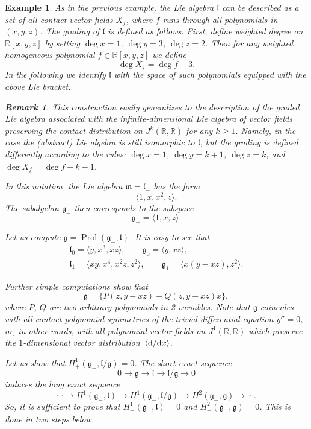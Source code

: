 \documentclass[pdftex]{sigma}%
\newcommand{\R}{\mathbb R}
\newcommand{\g}{\mathfrak g}
\newcommand{\lf}{\mathfrak l}
\newcommand{\m}{\mathfrak m}
\newcommand{\Prol}{\operatorname{Prol}}
\newtheorem{ex}[thm]{Example}
\newtheorem{rem}[thm]{Remark}}
\numberwithin{equation}{section}
\begin{document}
\begin{ex}
	As in the previous example, the Lie algebra $\lf$ can be described as a set of all contact vector fields $X_f$, where $f$ runs through all polynomials in $(x,y,z)$. The grading of $\lf$ is defined as follows. First, define weighted degree on $\R[x,y,z]$ by setting $\deg x = 1$, $\deg y = 3$, $\deg z = 2$. Then for any weighted homogeneous polynomial $f\in\R[x,y,z]$ we define
	\[
	\deg X_f = \deg f - 3.
	\]
	In the following we identify $\lf$ with the space of such polynomials equipped with the above Lie bracket.
	\begin{rem}
		This construction easily generalizes to the description of the graded Lie algebra associated with the infinite-dimensional Lie algebra of vector fields preserving the contact distribution on $J^k(\R,\R)$ for any $k\ge 1$. Namely, in the case the (abstract) Lie algebra is still isomorphic to $\lf$, but the grading is defined differently according to the rules: $\deg x = 1$, $\deg y = k+1$, $\deg z = k$, and $\deg X_f =\deg f-k-1$.
	\end{rem}
	
	In this notation, the Lie algebra $\m=\lf_{-}$ has the form
	\[
	\langle 1, x, x^2, z\rangle.
	\]
	The subalgebra $\g_{-}$ then corresponds to the subspace
	\[
	\g_{-} = \langle 1, x, z \rangle.
	\]
	
	Let us compute $\g=\Prol(\g_{-}, \lf)$. It is easy to see that
	\begin{gather*}
	\lf_0 = \big\langle y, x^3, xz \big\rangle,\qquad
	\g_0 = \langle y, xz \rangle,\\
	\lf_1 = \big\langle xy, x^4, x^2z, z^2\big\rangle,\qquad
	\g_1 = \big\langle x(y-xz), z^2 \big\rangle.
	\end{gather*}
	
	Further simple computations show that
	\[
	\g = \{ P(z,y-xz)+Q(z,y-xz)x \},
	\]
	where $P$, $Q$ are two arbitrary polynomials in 2 variables. Note that $\g$ coincides with all contact polynomial symmetries of the trivial differential equation $y''=0$, or, in other words, with all polynomial vector fields on $J^1(\R,\R)$ which preserve the $1$-dimensional vector distribu\-tion~$\langle {\rm d}/{\rm d}x \rangle$.
	
	{\samepage
Let us show that $H^1_+(\g_{-},\lf/\g)=0$. The short exact sequence
	\[
	0\to \g \to \lf \to \lf/\g \to 0
	\]
	induces the long exact sequence
	\begin{equation}\label{lex}
	\cdots \to H^1(\g_{-}, \lf) \to H^1(\g_{-}, \lf/\g) \to H^2(\g_{-},\g) \to \cdots.
	\end{equation}
	So, it is sufficient to prove that $H^1_{+}(\g_{-}, \lf) = 0$ and $H^2_{+}(\g_{-},\g)=0$. This is done in two steps below.

}
\end{ex}
\end{document}
